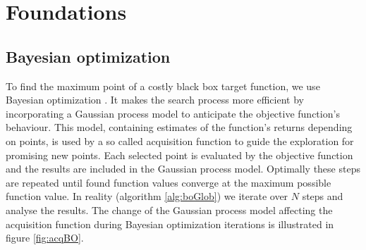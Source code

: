 \chapter{Foundations}
\label{chap:2}

\section{Bayesian optimization}


To find the maximum point of a costly black box target function, we use Bayesian optimization \cite{brochu2010tutorial,shahriari2016taking,lizotte2008practical}. It makes the search process more efficient by incorporating a Gaussian process model to anticipate the objective function's behaviour. This model, containing estimates of the function's returns depending on points, is used by a so called acquisition function to guide the exploration for promising new points. Each selected point is evaluated by the objective function and the results are included in the Gaussian process model. Optimally these steps are repeated until found function values converge at the maximum possible function value. In reality (algorithm \ref{alg:boGlob}) we iterate over $N$ steps and analyse the results. The change of the Gaussian process model affecting the acquisition function during Bayesian optimization iterations is illustrated in figure \ref{fig:acqBO}.\\

